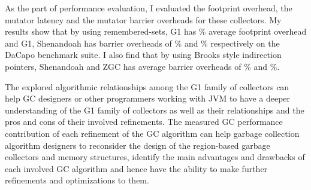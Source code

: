 As the part of performance evaluation, I evaluated the footprint overhead,
the mutator latency and the mutator barrier overheads for these collectors.
My results show that by using remembered-sets, G1 has \% average footprint overhead
and G1, Shenandoah has barrier overheads of \% and \%
respectively on the DaCapo benchmark suite. I also find that by using Brooks
style indirection pointers, Shenandoah and ZGC has average barrier overheads
of \% and \%.

The explored algorithmic relationships among the G1 family of collectors can help
GC designers or other programmers working with JVM to have a deeper understanding of
the G1 family of collectors as well as their relationships and the pros and cons of their involved refinements.
The measured GC performance contribution of each refinement of the GC algorithm
can help garbage collection algorithm designers to reconsider the design of 
the region-based garbage collectors and memory structures, identify
the main advantages and drawbacks of each involved GC algorithm and
hence have the ability to make further refinements and optimizations to them.

